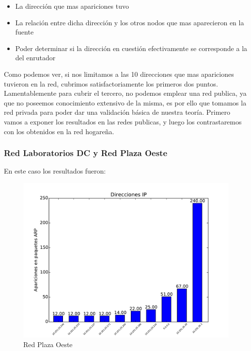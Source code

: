 \begin{itemize}
	\item La dirección que mas apariciones tuvo
	\item La relación entre dicha dirección y los otros nodos que mas aparecieron en la fuente
	\item Poder determinar si la dirección en cuestión efectivamente se corresponde a la del enrutador
\end{itemize}

Como podemos ver, si nos limitamos a las 10 direcciones que mas apariciones tuvieron en la red, cubrimos satisfactoriamente los primeros dos puntos. Lamentablemente para cubrir el tercero, no podemos emplear una red publica, ya que no poseemos conocimiento extensivo de la misma, es por ello que tomamos la red privada para poder dar una validación básica de nuestra teoría. Primero vamos a exponer los resultados en las redes publicas, y luego los contrastaremos con los obtenidos en la red hogareña.


\subsubsection{Red Laboratorios DC y Red Plaza Oeste}

En este caso los resultados fueron:

\begin{figure}[H]
\begin{center}
\includegraphics[width=0.8\columnwidth]{graficos/plaza_top_s2.pdf}
\caption{Red Plaza Oeste}
\end{center}
\end{figure}

